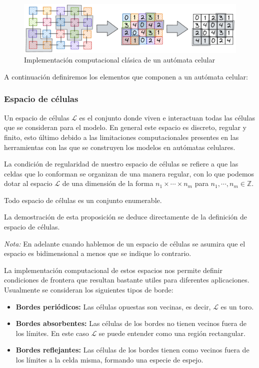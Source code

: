 \begin{figure}[h]
  \centering
    \includegraphics[width=1\textwidth]{Imagenes/ACaMatriz.PNG}
  \caption{Implementación computacional clásica de un autómata celular}
  \label{fig:AC a matriz}
\end{figure}

A continuación definiremos los elementos que componen a un autómata celular:

\subsubsection{Espacio de células}

Un espacio de células $\mathcal{L}$ es el conjunto donde viven e interactuan todas las células que se consideran para el modelo. En general este espacio es discreto, regular y finito, esto último debido a las limitaciones computacionales presentes en las herramientas con las que se construyen los modelos en autómatas celulares.

La condición de regularidad de nuestro espacio de células se refiere a que las celdas que lo conforman se organizan de una manera regular, con lo que podemos dotar al espacio $\mathcal{L}$ de una dimensión de la forma $n_1\times\cdots\times n_m$ para $n_1,\cdots,n_m\in\mathbb{Z}$.

\begin{proposicion}\label{pro:LEsEnumerable}
Todo espacio de células es un conjunto enumerable.
\end{proposicion}

La demostración de esta proposición se deduce directamente de la definición de espacio de células.

\textit{Nota:} En adelante cuando hablemos de un espacio de células se asumira que el espacio es bidimensional a menos que se indique lo contrario.

La implementación computacional de estos espacios nos permite definir condiciones de frontera que resultan bastante utiles para diferentes aplicaciones. Usualmente se consideran los siguientes tipos de borde:

\begin{itemize}
    \item \textbf{Bordes periódicos:} Las células opuestas son vecinas, es decir, $\mathcal{L}$ es un toro.
    \item \textbf{Bordes absorbentes:} Las células de los bordes no tienen vecinos fuera de los límites. En este caso $\mathcal{L}$ se puede entender como una región rectangular.
    \item \textbf{Bordes reflejantes:} Las células de los bordes tienen como vecinos fuera de los límites a la celda misma, formando una especie de espejo.
\end{itemize}

